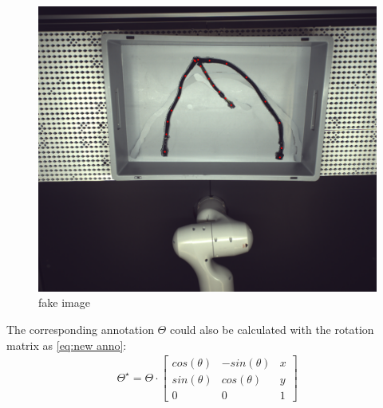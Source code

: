\begin{figure}
	\centering
	\includegraphics[width=0.6\linewidth]{example_images/img_0_segment_fakeImages}
	\caption{fake image}
	\label{fig:fake image}
\end{figure}
The corresponding annotation $\Theta $ could also be calculated with the rotation matrix as \autoref{eq:new anno}:
\begin{align}
	\Theta ^{\star } = \Theta \cdot \begin{bmatrix}
		cos(\theta)&  -sin(\theta )&x \\
		sin(\theta )&  cos(\theta )&y  \\
		0&  0&1
	  \end{bmatrix} \label{eq:new anno}
\end{align}
